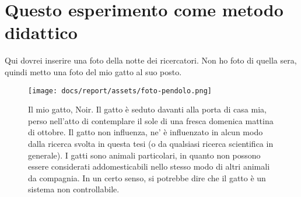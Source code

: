 \section{Questo esperimento come metodo didattico}
Qui dovrei inserire una foto della notte dei ricercatori. Non ho foto di quella sera,
quindi metto una foto del mio gatto al suo posto.

\begin{figure}[H]
    \centering
    \texttt{[image: docs/report/assets/foto-pendolo.png]}
    \caption[Noir]{
        Il mio gatto, Noir. Il gatto è seduto davanti alla porta di
        casa mia, perso nell'atto di contemplare il sole di una fresca domenica mattina di
        ottobre. Il gatto non influenza, ne' è influenzato in alcun modo dalla ricerca svolta in questa tesi (o da qualsiasi ricerca scientifica in generale).
        I gatti sono animali particolari, in quanto non possono essere considerati
        addomesticabili nello stesso modo di altri animali da compagnia. In un certo
        senso, si potrebbe dire che il gatto è un sistema non controllabile.
    }
    \label{fig:noir}
\end{figure}
